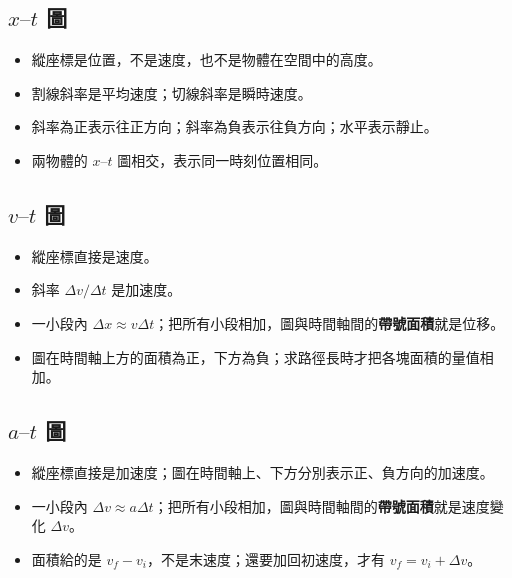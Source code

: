 \documentclass[11pt,a4paper]{article}
\providecommand{\tightlist}{%
  \setlength{\itemsep}{0pt}\setlength{\parskip}{0pt}}
\begin{document}
\subsection{\texorpdfstring{\(x\text{–}t\) 圖}{x\textbackslash text\{--\}t 圖}}\label{xtextt-ux5716}

\begin{itemize}
\tightlist
\item
  縱座標是位置，不是速度，也不是物體在空間中的高度。
\item
  割線斜率是平均速度；切線斜率是瞬時速度。
\item
  斜率為正表示往正方向；斜率為負表示往負方向；水平表示靜止。
\item
  兩物體的 \(x\text{–}t\) 圖相交，表示同一時刻位置相同。
\end{itemize}

\subsection{\texorpdfstring{\(v\text{–}t\) 圖}{v\textbackslash text\{--\}t 圖}}\label{vtextt-ux5716}

\begin{itemize}
\tightlist
\item
  縱座標直接是速度。
\item
  斜率 \(\Delta v/\Delta t\) 是加速度。
\item
  一小段內 \(\Delta x\approx v\Delta t\)；把所有小段相加，圖與時間軸間的\textbf{帶號面積}就是位移。
\item
  圖在時間軸上方的面積為正，下方為負；求路徑長時才把各塊面積的量值相加。
\end{itemize}

\subsection{\texorpdfstring{\(a\text{–}t\) 圖}{a\textbackslash text\{--\}t 圖}}\label{atextt-ux5716}

\begin{itemize}
\tightlist
\item
  縱座標直接是加速度；圖在時間軸上、下方分別表示正、負方向的加速度。
\item
  一小段內 \(\Delta v\approx a\Delta t\)；把所有小段相加，圖與時間軸間的\textbf{帶號面積}就是速度變化 \(\Delta v\)。
\item
  面積給的是 \(v_f-v_i\)，不是末速度；還要加回初速度，才有 \(v_f=v_i+\Delta v\)。
\end{itemize}
\end{document}
